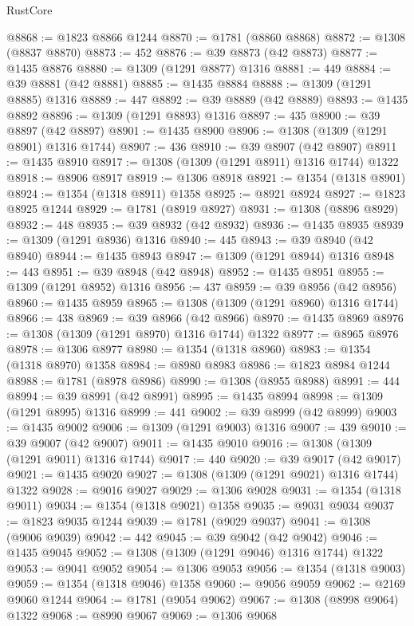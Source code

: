 \begin{lexlean}{RustCore}
\begin{coremodule}
@8868 := @1823 @8866 @1244
@8870 := @1781 (@8860 @8868)
@8872 := @1308 (@8837 @8870)
@8873 := 452
@8876 := @39 @8873 (@42 @8873)
@8877 := @1435 @8876
@8880 := @1309 (@1291 @8877) @1316
@8881 := 449
@8884 := @39 @8881 (@42 @8881)
@8885 := @1435 @8884
@8888 := @1309 (@1291 @8885) @1316
@8889 := 447
@8892 := @39 @8889 (@42 @8889)
@8893 := @1435 @8892
@8896 := @1309 (@1291 @8893) @1316
@8897 := 435
@8900 := @39 @8897 (@42 @8897)
@8901 := @1435 @8900
@8906 := @1308 (@1309 (@1291 @8901) @1316 @1744)
@8907 := 436
@8910 := @39 @8907 (@42 @8907)
@8911 := @1435 @8910
@8917 := @1308 (@1309 (@1291 @8911) @1316 @1744) @1322
@8918 := @8906 @8917
@8919 := @1306 @8918
@8921 := @1354 (@1318 @8901)
@8924 := @1354 (@1318 @8911) @1358
@8925 := @8921 @8924
@8927 := @1823 @8925 @1244
@8929 := @1781 (@8919 @8927)
@8931 := @1308 (@8896 @8929)
@8932 := 448
@8935 := @39 @8932 (@42 @8932)
@8936 := @1435 @8935
@8939 := @1309 (@1291 @8936) @1316
@8940 := 445
@8943 := @39 @8940 (@42 @8940)
@8944 := @1435 @8943
@8947 := @1309 (@1291 @8944) @1316
@8948 := 443
@8951 := @39 @8948 (@42 @8948)
@8952 := @1435 @8951
@8955 := @1309 (@1291 @8952) @1316
@8956 := 437
@8959 := @39 @8956 (@42 @8956)
@8960 := @1435 @8959
@8965 := @1308 (@1309 (@1291 @8960) @1316 @1744)
@8966 := 438
@8969 := @39 @8966 (@42 @8966)
@8970 := @1435 @8969
@8976 := @1308 (@1309 (@1291 @8970) @1316 @1744) @1322
@8977 := @8965 @8976
@8978 := @1306 @8977
@8980 := @1354 (@1318 @8960)
@8983 := @1354 (@1318 @8970) @1358
@8984 := @8980 @8983
@8986 := @1823 @8984 @1244
@8988 := @1781 (@8978 @8986)
@8990 := @1308 (@8955 @8988)
@8991 := 444
@8994 := @39 @8991 (@42 @8991)
@8995 := @1435 @8994
@8998 := @1309 (@1291 @8995) @1316
@8999 := 441
@9002 := @39 @8999 (@42 @8999)
@9003 := @1435 @9002
@9006 := @1309 (@1291 @9003) @1316
@9007 := 439
@9010 := @39 @9007 (@42 @9007)
@9011 := @1435 @9010
@9016 := @1308 (@1309 (@1291 @9011) @1316 @1744)
@9017 := 440
@9020 := @39 @9017 (@42 @9017)
@9021 := @1435 @9020
@9027 := @1308 (@1309 (@1291 @9021) @1316 @1744) @1322
@9028 := @9016 @9027
@9029 := @1306 @9028
@9031 := @1354 (@1318 @9011)
@9034 := @1354 (@1318 @9021) @1358
@9035 := @9031 @9034
@9037 := @1823 @9035 @1244
@9039 := @1781 (@9029 @9037)
@9041 := @1308 (@9006 @9039)
@9042 := 442
@9045 := @39 @9042 (@42 @9042)
@9046 := @1435 @9045
@9052 := @1308 (@1309 (@1291 @9046) @1316 @1744) @1322
@9053 := @9041 @9052
@9054 := @1306 @9053
@9056 := @1354 (@1318 @9003)
@9059 := @1354 (@1318 @9046) @1358
@9060 := @9056 @9059
@9062 := @2169 @9060 @1244
@9064 := @1781 (@9054 @9062)
@9067 := @1308 (@8998 @9064) @1322
@9068 := @8990 @9067
@9069 := @1306 @9068

\end{coremodule}
\end{lexlean}
